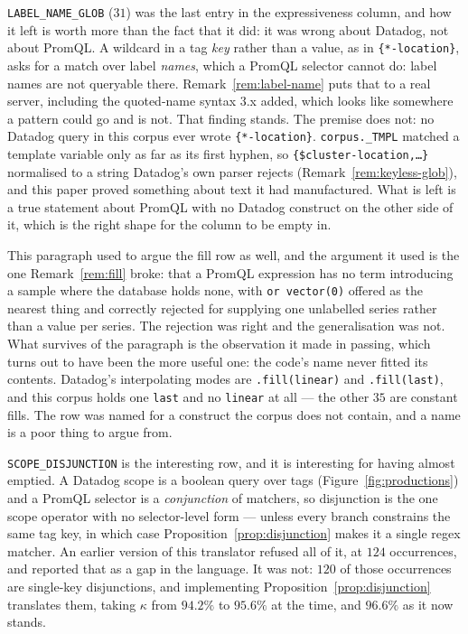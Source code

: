 
\texttt{LABEL\_NAME\_GLOB} ($31$) was the last entry in the expressiveness column, and
how it left is worth more than the fact that it did: it was wrong about Datadog, not
about PromQL. A wildcard in a tag \emph{key} rather than a value, as in
\texttt{\{*-location\}}, asks for a match over label \emph{names}, which a PromQL
selector cannot do: label names are not queryable there.
Remark~\ref{rem:label-name} puts that to a real server, including the quoted-name
syntax 3.x added, which looks like somewhere a pattern could go and is not. That
finding stands. The premise does not: no Datadog query in this corpus ever wrote
\texttt{\{*-location\}}. \texttt{corpus.\_TMPL} matched a template variable only as far
as its first hyphen, so \texttt{\{\$cluster-location,\dots\}} normalised to a string
Datadog's own parser rejects (Remark~\ref{rem:keyless-glob}), and this paper proved
something about text it had manufactured. What is left is a true statement about PromQL
with no Datadog construct on the other side of it, which is the right shape for the
column to be empty in.

This paragraph used to argue the fill row as well, and the argument it used is the one
Remark~\ref{rem:fill} broke: that a PromQL expression has no term introducing a sample
where the database holds none, with \texttt{or vector(0)} offered as the nearest thing
and correctly rejected for supplying one unlabelled series rather than a value per
series. The rejection was right and the generalisation was not. What survives of the
paragraph is the observation it made in passing, which turns out to have been the more
useful one: the code's name never fitted its contents. Datadog's interpolating modes
are \texttt{.fill(linear)} and \texttt{.fill(last)}, and this corpus holds one
\texttt{last} and no \texttt{linear} at all --- the other $35$ are constant fills. The
row was named for a construct the corpus does not contain, and a name is a poor thing
to argue from.

\texttt{SCOPE\_DISJUNCTION} is the interesting row, and it is interesting for having
almost emptied. A Datadog scope is a boolean query over tags
(Figure~\ref{fig:productions}) and a PromQL selector is a \emph{conjunction} of matchers,
so disjunction is the one scope operator with no selector-level form --- unless every
branch constrains the same tag key, in which case Proposition~\ref{prop:disjunction}
makes it a single regex matcher. An earlier version of this translator refused all of
it, at $124$ occurrences, and reported that as a gap in the language. It was not: $120$
of those occurrences are single-key disjunctions, and implementing
Proposition~\ref{prop:disjunction} translates them, taking $\kappa$ from $94.2\%$ to
$95.6\%$ at the time, and $96.6\%$ as it now stands.


